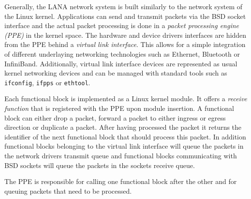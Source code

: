 \documentclass{sig-alternate}
\begin{document}
Generally, the LANA network system is built similarly to the network system of the Linux kernel.
Applications can send and transmit packets via the BSD socket interface and the actual packet processing is done in a \textit{packet processing engine (PPE)} in the kernel space.
The hardware and device drivers interfaces are hidden from the PPE behind a \textit{virtual link interface}. This allows for a simple integration of different underlaying networking technologies such as Ethernet, Bluetooth or InfiniBand. Additionally, virtual link interface devices are represented as usual kernel networking devices and can be managed with standard tools such as \texttt{ifconfig}, \texttt{ifpps} or \texttt{ethtool}.

Each functional block is implemented as a Linux kernel module. It offers a \textit{receive function} that is registered with the PPE upon module insertion. 
A functional block can either drop a packet, forward a packet to either ingress or egress direction or duplicate a packet. After having processed the packet it returns the identifier of the next functional block that should process this packet. In addition functional blocks belonging to the virtual link interface will queue the packets in the network drivers transmit queue and functional blocks communicating with BSD sockets will queue the packets in the sockets receive queue.

The PPE is responsible for calling one functional block after the other and for queuing packets that need to be processed.


\end{document}
